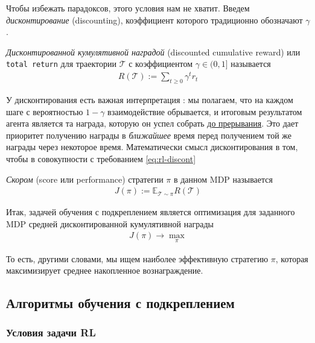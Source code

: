 \documentclass[%
	11pt,
	a4paper,
	utf8,
		]{article}
\begin{document}
Чтобы избежать парадоксов, этого условия нам не хватит. Введем \emph{дисконтирование} (discounting), коэффициент которого традиционно обозначают $ \gamma $.

\emph{Дисконтированной кумулятивной наградой} (discounted cumulative reward) или \texttt{total return} для траектории $ \mathcal{T} $ с коэффициентом $ \gamma \in (0, 1] $ называется
\begin{align*}
	R(\mathcal{T}) := \sum_{t \geqslant 0} \gamma^t r_t
\end{align*}

У дисконтирования есть важная интерпретация \cite[]{ivanov:rl-2022}: мы полагаем, что на каждом шаге с вероятностью $ 1 - \gamma $ взаимодействие обрывается, и итоговым результатом агента является та награда, которую он успел собрать \underline{до прерывания}. Это дает приоритет получению награды в \emph{ближайшее} время перед получением той же награды через некоторое время. Математически смысл дисконтирования в том, чтобы в совокупности с требованием \eqref{eq:rl-discont}

\emph{Скором} (score  или performance) стратегии $ \pi $ в данном MDP называется \cite[]{ivanov:rl-2022} 
\begin{align*}
	J(\pi) := \mathbb{E}_{\mathcal{T} \sim \pi} R(\mathcal{T})
\end{align*}

Итак, задачей обучения с подкреплением является оптимизация для заданного MDP средней дисконтированной кумулятивной награды
\begin{align*}
	J(\pi) \rightarrow \underset{\pi}{\max}
\end{align*}

То есть, другими словами, мы ищем наиболее эффективную стратегию $ \pi $, которая максимизирует среднее накопленное вознаграждение.

\subsection{Алгоритмы обучения с подкреплением}

\subsubsection{Условия задачи RL}
\end{document}
